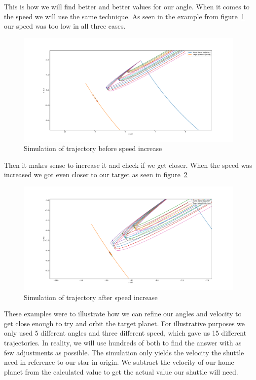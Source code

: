 \documentclass[reprint,english,notitlepage]{revtex4-2}
\begin{document}
This is how we will find better and better values for our angle.
When it comes to the speed we will use the same technique.
As seen in the example from figure~\ref{fig: pre speed increase} our speed was too low in all three cases.

\begin{figure}[h!]
  \centering
  \includegraphics[scale = .125]{Figures/pre_speed_increase}
  \caption{Simulation of trajectory before speed increase}
  \label{fig: pre speed increase}
\end{figure}

Then it makes sense to increase it and check if we get closer.
When the speed was increased we got even closer to our target as seen in figure~\ref{fig: post speed increase}

\begin{figure}[h!]
  \centering
  \includegraphics[scale = .125]{Figures/post_speed_increase}
  \caption{Simulation of trajectory after speed increase}
  \label{fig: post speed increase}
\end{figure}

These examples were to illustrate how we can refine our angles and velocity to get close enough to try and orbit the target planet.
For illustrative purposes we only used 5 different angles and three different speed, which gave us 15 different trajectories.
In reality, we will use hundreds of both to find the answer with as few adjustments as possible.
The simulation only yields the velocity the shuttle need in reference to our star in origin.
We subtract the velocity of our home planet from the calculated value to get the actual value our shuttle will need.
\end{document}
